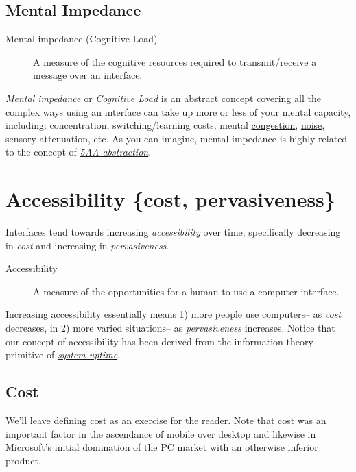 \documentclass[logo,bsc,singlespacing,parskip]{infthesis}
\begin{document}
\subsection{Mental Impedance}
\label{sec:orgbe59543}
\medskip
\begin{mdframed}
\begin{description}
\item[{Mental impedance\label{mental impedance} (Cognitive Load\label{cognitive load})}] A measure of the cognitive resources required to transmit/receive a message over an interface.
\end{description}
\end{mdframed}

\emph{Mental impedance} or \emph{Cognitive Load} is an abstract concept covering all the complex ways using an interface can take up more or less of your mental capacity, including: concentration, switching/learning costs, mental \hyperref[org99cfbfd]{congestion}, \hyperref[noise]{noise}, sensory attenuation, etc.
As you can imagine, mental impedance is highly related to the concept of \emph{\hyperref[abstraction]{5AA-abstraction}}.

\section{Accessibility \{cost, pervasiveness\}}
\label{sec:org2ac9d76}
Interfaces tend towards increasing \emph{accessibility} over time; specifically decreasing in \emph{cost} and increasing in \emph{pervasiveness}.

\begin{mdframed}
\begin{description}
\item[{Accessibility\label{accessibility}}] A measure of the opportunities for a human to use a computer interface.
\end{description}
\end{mdframed}

Increasing accessibility essentially means 1) more people use computers-- as \emph{cost} decreases, in 2) more varied situations-- as \emph{pervasiveness} increases.
Notice that our concept of accessibility has been derived from the information theory primitive of \emph{\hyperref[org1125b77]{system uptime}}.
\subsection{Cost}
\label{sec:org52afe96}
We'll leave defining cost as an exercise for the reader.
Note that cost was an important factor in the ascendance of mobile over desktop and likewise in Microsoft's initial domination of the PC market with an otherwise inferior product.
\end{document}
